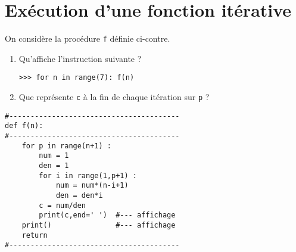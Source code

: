 \documentclass[11pt,a4paper]{article}
\begin{document}
\section{Exécution d'une fonction itérative}
\begin{minipage}[t]{7cm}
On considère la procédure {\tt f} définie ci-contre.
\begin{enumerate}
\item Qu'affiche l'instruction sui\-vante ?
\begin{verbatim}
>>> for n in range(7): f(n)

\end{verbatim}
\item Que représente {\tt c} à la fin de chaque itération sur {\tt p} ?
\end{enumerate}
\end{minipage}
\hfill
\begin{py}{8cm}
\begin{verbatim}
#----------------------------------------
def f(n):
#----------------------------------------
    for p in range(n+1) :
        num = 1
        den = 1
        for i in range(1,p+1) :
            num = num*(n-i+1)
            den = den*i
        c = num/den
        print(c,end=' ')  #--- affichage
    print()               #--- affichage
    return
#----------------------------------------
\end{verbatim}
\end{py}
\vspace*{3mm}

\noindent{}
\mbox{}\hfill
{}

\label{fini}
\end{document}
